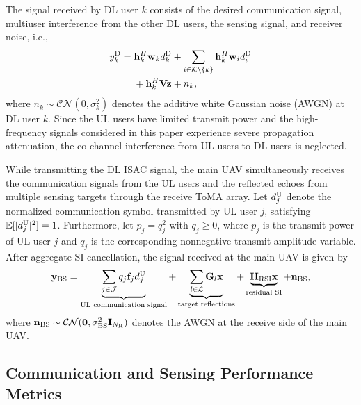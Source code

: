 \documentclass[letterpaper,journal]{IEEEtran}
\begin{document}
The signal received by DL user $k$ consists of the desired communication signal, multiuser interference from the other DL users, the sensing signal, and receiver noise, i.e.,
\begin{equation}
\begin{aligned}
y_k^{\rm D}
={}&
\mathbf h_k^H\mathbf w_kd_k^{\rm D}
+
\sum_{i\in\mathcal K\setminus\{k\}}
\mathbf h_k^H\mathbf w_i d_i^{\rm D}
\\
&+
\mathbf h_k^H\mathbf V\mathbf z
+
n_k,
\end{aligned}
\label{eq:dl_received_signal}
\end{equation}
where $n_k\sim\mathcal{CN}(0,\sigma_k^2)$ denotes the additive white Gaussian noise (AWGN) at DL user $k$. Since the UL users have limited transmit power and the high-frequency signals considered in this paper experience severe propagation attenuation, the co-channel interference from UL users to DL users is neglected.

While transmitting the DL ISAC signal, the main UAV simultaneously receives the communication signals from the UL users and the reflected echoes from multiple sensing targets through the receive ToMA array. Let $d_j^{\rm U}$ denote the normalized communication symbol transmitted by UL user $j$, satisfying $\mathbb E[|d_j^{\rm U}|^2]=1$. Furthermore, let $p_j=q_j^2$ with $q_j\ge0$, where $p_j$ is the transmit power of UL user $j$ and $q_j$ is the corresponding nonnegative transmit-amplitude variable. After aggregate SI cancellation, the signal received at the main UAV is given by
\begin{equation}
\mathbf y_{\rm BS}
=
\underbrace{
\sum_{j\in\mathcal J}
q_j\mathbf f_jd_j^{\rm U}
}_{\text{UL communication signal}}
+
\underbrace{
\sum_{l\in\mathcal L}
\mathbf G_l\mathbf x
}_{\text{target reflections}}
+
\underbrace{
\mathbf H_{\rm RSI}\mathbf x
}_{\text{residual SI}}
+
\mathbf n_{\rm BS},
\label{eq:bs_received_signal}
\end{equation}
where $\mathbf n_{\rm BS}\sim\mathcal{CN}(\mathbf 0,\sigma_{\rm BS}^2\mathbf I_{N_{\rm R}})$ denotes the AWGN at the receive side of the main UAV.

\subsection{Communication and Sensing Performance Metrics}
\label{subsec:performance_metrics}
\end{document}
